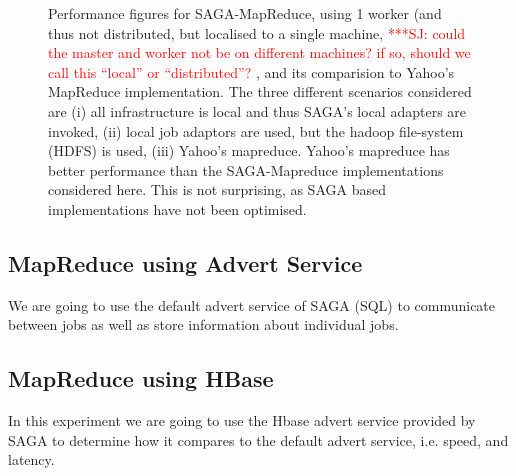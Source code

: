\documentclass[conference,final]{IEEEtran}
\newcommand{\jhanote}[1]{ {\textcolor{red} { ***SJ: #1 }}}
\newcommand{\jhanote}[1]{}
\begin{document}
\begin{figure}[t]
      \centering
          \caption{Performance figures for SAGA-MapReduce, using 1
            worker (and thus not distributed, but localised to a
            single machine, \jhanote{could the master and worker not
              be on different machines? if so, should we call this
              ``local'' or ``distributed''?}, and its comparision to
            Yahoo's MapReduce implementation. The three different
            scenarios considered are (i) all infrastructure is local
            and thus SAGA's local adapters are invoked, (ii) local job
            adaptors are used, but the hadoop file-system (HDFS) is
            used, (iii) Yahoo's mapreduce. Yahoo's mapreduce has
            better performance than the SAGA-Mapreduce implementations
            considered here. This is not surprising, as SAGA based
            implementations have not been optimised.}
      \label{saga_mapreduce_1worker.png}
\end{figure}


\begin{figure}[t]
      \centering
          \caption{}
      \label{saga_mapreduce_3workers.png}
\end{figure}


\begin{figure}[t]
      \centering
          \caption{}
      \label{sagaallpairs}
\end{figure}


\begin{figure}[t]
      \centering
          \caption{}
      \label{saga_allpairs_1and3workers.png}
\end{figure}


\subsection*{MapReduce using Advert Service}
We are going to use the default advert service of SAGA (SQL) to 
communicate between jobs as well as store information about 
individual jobs.

\subsection*{MapReduce using HBase}
In this experiment we are going to use the Hbase advert service 
provided by SAGA to determine how it compares to the default advert 
service, i.e. speed, and latency.
\end{document}
